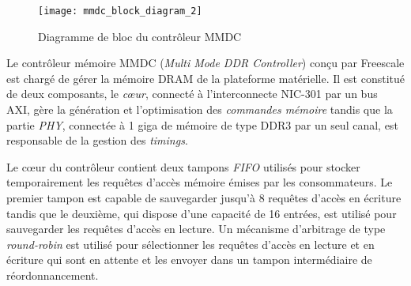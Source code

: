 
        \begin{figure}[!ht]
            \centering
            \texttt{[image: mmdc\_block\_diagram\_2]}
            \caption{Diagramme de bloc du contrôleur MMDC  \cite{manuel:i_MX_6Dual_6Quad_applications_processor_reference_manual}}
            \label{fig:mmdc_block_diagram_2}
        \end{figure}

        Le contrôleur mémoire MMDC (\emph{Multi Mode DDR Controller}) conçu par Freescale est chargé de gérer la mémoire DRAM de la plateforme matérielle. Il est constitué de deux composants, le \emph{cœur}, connecté à l'interconnecte NIC-301 par un bus AXI, gère la génération et l'optimisation des \emph{commandes mémoire} tandis que la partie \emph{PHY}, connectée à 1 giga de mémoire de type DDR3 \cite{manuel:SABRE_lite_hardware_user_manual} par un seul canal, est responsable de la gestion des \emph{timings}.




        Le cœur du contrôleur contient deux tampons \emph{FIFO} utilisés pour stocker temporairement les requêtes d'accès mémoire émises par les consommateurs. Le premier tampon est capable de sauvegarder jusqu'à 8 requêtes d'accès en écriture tandis que le deuxième, qui dispose d'une capacité de 16 entrées, est utilisé pour sauvegarder les requêtes d'accès en lecture.
        Un mécanisme d'arbitrage de type \emph{round-robin} est utilisé pour sélectionner les requêtes d'accès en lecture et en écriture qui sont en attente et les envoyer dans un tampon intermédiaire de réordonnancement.

